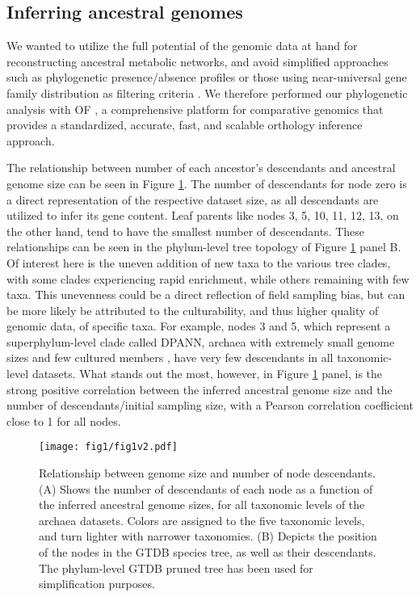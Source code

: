 \subsection*{Inferring ancestral genomes}

We wanted to utilize the full potential of the genomic data at hand for reconstructing ancestral metabolic networks, and avoid simplified approaches such as phylogenetic presence/absence profiles \cite{kreimer2008} or those using near-universal gene family distribution as filtering criteria \cite{xavier2021}. We therefore performed our phylogenetic analysis with OF \cite{emms2019, emms2015}, a comprehensive platform for comparative genomics that provides a standardized, accurate, fast, and scalable orthology inference approach. 

The relationship between number of each ancestor's descendants and ancestral genome size can be seen in Figure \ref{node_descendants_genomesize}. The number of descendants for node zero is a direct representation of the respective dataset size, as all descendants are utilized to infer its gene content. Leaf parents like nodes 3, 5, 10, 11, 12, 13, on the other hand, tend to have the smallest number of descendants. These relationships can be seen in the phylum-level tree topology of Figure \ref{node_descendants_genomesize} panel B. Of interest here is the uneven addition of new taxa to the various tree clades, with some clades experiencing rapid enrichment, while others remaining with few taxa. This unevenness could be a direct reflection of field sampling bias, but can be more likely be attributed to the culturability, and thus higher quality of genomic data, of specific taxa. For example, nodes 3 and 5, which represent a superphylum-level clade called DPANN, archaea with extremely small genome sizes and few cultured members \cite{dombrowski2019, dombrowski2020}, have very few descendants in all taxonomic-level datasets. What stands out the most, however, in Figure \ref{node_descendants_genomesize} panel, is the strong positive correlation between the inferred ancestral genome size and the number of descendants/initial sampling size, with a Pearson correlation coefficient close to 1 for all nodes. 

\begin{figure}[H]
    \centering
    \texttt{[image: fig1/fig1v2.pdf]}
    \caption{Relationship between genome size and number of node descendants. (A) Shows the number of descendants of each node as a function of the inferred ancestral genome sizes, for all taxonomic levels of the archaea datasets. Colors are assigned to the five taxonomic levels, and turn lighter with narrower taxonomies. (B) Depicts the position of the nodes in the GTDB species tree, as well as their descendants. The phylum-level GTDB pruned tree has been used for simplification purposes. }
    \label{node_descendants_genomesize}
\end{figure}   


